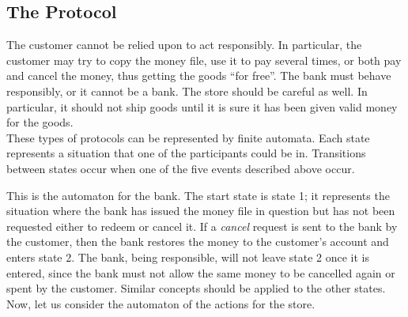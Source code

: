 \documentclass[]{article}
\begin{document}
  \subsection*{The Protocol}
    The customer cannot be relied upon to act responsibly. In particular, the 
    customer may try to copy the money file, use it to pay several times, or 
    both pay and cancel the money, thus getting the goods ``for free''. The 
    bank must behave responsibly, or it cannot be a bank. The store should be 
    careful as well. In particular, it should not ship goods until it is sure 
    it has been given valid money for the goods. \\
    \indent These types of protocols can be represented by finite automata. 
    Each state represents a situation that one of the participants could be 
    in. Transitions between states occur when one of the five events described 
    above occur. \\

    
    This is the automaton for the bank. The start state is state 1; it
    represents the situation where the bank has issued the money file in
    question but has not been requested either to redeem or cancel it. If a
    \emph{cancel} request is sent to the bank by the customer, then the bank
    restores the money to the customer's account and enters state 2. The bank,
    being responsible, will not leave state 2 once it is entered, since the 
    bank must not allow the same money to be cancelled again or spent by the
    customer. Similar concepts should be applied to the other states. \\
    \indent Now, let us consider the automaton of the actions for the store.\\
    
\end{document}
